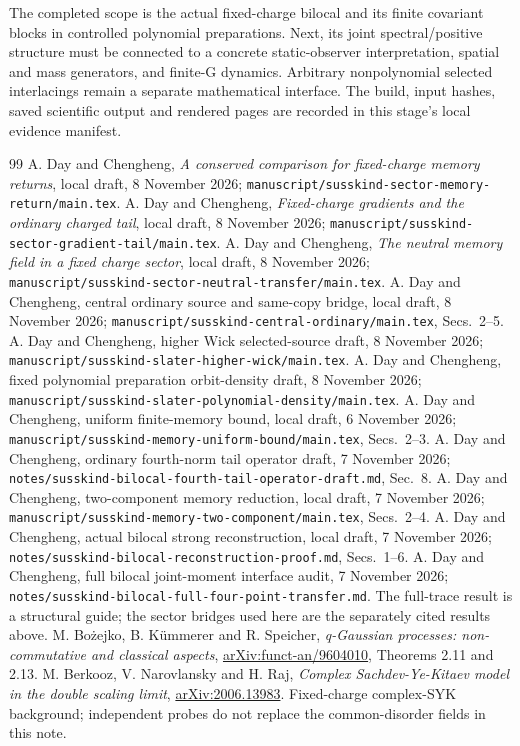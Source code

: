 \documentclass[11pt]{article}
\begin{document}
The completed scope is the actual fixed-charge bilocal and its
finite covariant blocks in controlled polynomial preparations.
Next, its joint spectral/positive structure must be connected
to a concrete static-observer interpretation, spatial and mass
generators, and finite-G dynamics. Arbitrary nonpolynomial
selected interlacings remain a separate mathematical interface.
The build, input hashes, saved scientific output and rendered
pages are recorded in this stage's local evidence manifest.

\newpage
\begin{thebibliography}{99}\small
{} A. Day and Chengheng, \emph{A conserved comparison
for fixed-charge memory returns}, local draft, 8 November 2026;
\texttt{manuscript/susskind-sector-memory-return/main.tex}.
 A. Day and Chengheng, \emph{Fixed-charge gradients
and the ordinary charged tail}, local draft, 8 November 2026;
\texttt{manuscript/susskind-sector-gradient-tail/main.tex}.
 A. Day and Chengheng, \emph{The neutral memory
field in a fixed charge sector}, local draft, 8 November 2026;
\texttt{manuscript/susskind-sector-neutral-transfer/main.tex}.
 A. Day and Chengheng, central ordinary source and
same-copy bridge, local draft, 8 November 2026;
\texttt{manuscript/susskind-central-ordinary/main.tex}, Secs.~2--5.
 A. Day and Chengheng, higher Wick selected-source
draft, 8 November 2026;
\texttt{manuscript/susskind-slater-higher-wick/main.tex}.
 A. Day and Chengheng, fixed polynomial preparation
orbit-density draft, 8 November 2026;
\texttt{manuscript/susskind-slater-polynomial-density/main.tex}.
 A. Day and Chengheng, uniform finite-memory bound,
local draft, 6 November 2026;
\texttt{manuscript/susskind-memory-uniform-bound/main.tex}, Secs.~2--3.
 A. Day and Chengheng, ordinary fourth-norm tail
operator draft, 7 November 2026;
\texttt{notes/susskind-bilocal-fourth-tail-operator-draft.md}, Sec.~8.
 A. Day and Chengheng, two-component memory reduction,
local draft, 7 November 2026;
\texttt{manuscript/susskind-memory-two-component/main.tex}, Secs.~2--4.
 A. Day and Chengheng, actual bilocal strong
reconstruction, local draft, 7 November 2026;
\texttt{notes/susskind-bilocal-reconstruction-proof.md}, Secs.~1--6.
 A. Day and Chengheng, full bilocal joint-moment
interface audit, 7 November 2026;
\texttt{notes/susskind-bilocal-full-four-point-transfer.md}.
The full-trace result is a structural guide; the sector bridges
used here are the separately cited results above.
 M. Bo\.{z}ejko, B. K\"ummerer and R. Speicher,
\emph{q-Gaussian processes: non-commutative and classical aspects},
\href{https://arxiv.org/abs/funct-an/9604010}{arXiv:funct-an/9604010},
Theorems 2.11 and 2.13.
 M. Berkooz, V. Narovlansky and H. Raj,
\emph{Complex Sachdev-Ye-Kitaev model in the double scaling limit},
\href{https://arxiv.org/abs/2006.13983}{arXiv:2006.13983}.
Fixed-charge complex-SYK background; independent probes do not
replace the common-disorder fields in this note.
\end{thebibliography}
\end{document}
